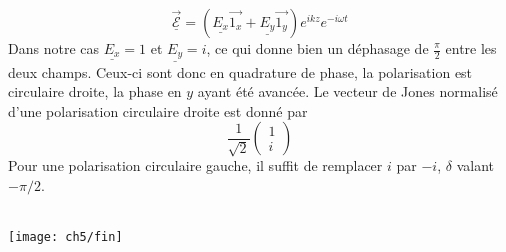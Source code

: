 		\begin{equation}
		\underline{\vec{\mathcal{E}}} = (\underline{E_x}\vec{1_x}+\underline{E_y}\vec{1_y})e^{ikz}e^{-i
		\omega t}
		\end{equation}
		Dans notre cas $\underline{E_x}=1$ et $\underline{E_y} = i$, ce qui donne bien un déphasage de 
		$\frac{\pi}{2}$ entre les deux champs. Ceux-ci sont donc en quadrature de phase, la polarisation 
		est circulaire droite, la phase en $y$ ayant été avancée. Le vecteur de Jones normalisé d'une 
		polarisation circulaire droite est donné par
		\begin{equation}
		\dfrac{1}{\sqrt{2}}\left(\begin{array}{c}
		1\\
		i
		\end{array}\right)
		\end{equation}
		Pour une polarisation circulaire gauche, il suffit de remplacer $i$ par $-i$, $\delta$ valant 
		$-\pi/2$.\\
		\\
		
		
		

			\begin{center}
	\texttt{[image: ch5/fin]}
\end{center}				
	
	
	
	
	
	
	
	
	
	
	
	
	
	
	
	

